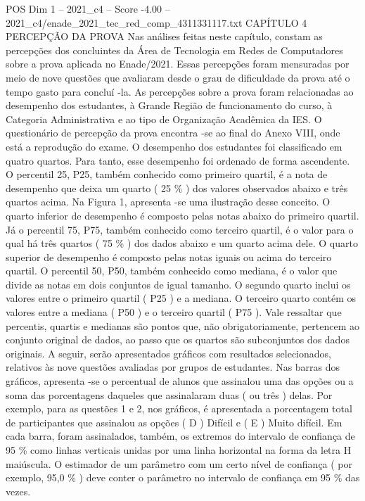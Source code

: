 \begin{textsample}{POS Dim 1 – 2021\_c4 – Score -4.00 – 2021\_c4/enade\_2021\_tec\_red\_comp\_4311331117.txt}  \label{ex:f1_pos_371}
CAPÍTULO 4 PERCEPÇÃO DA PROVA Nas análises feitas neste capítulo, constam as percepções dos concluintes da Área de Tecnologia em Redes de Computadores sobre a prova aplicada no Enade/2021.
Essas percepções foram mensuradas por meio de nove questões que avaliaram desde o grau de dificuldade da prova até o tempo gasto para concluí -la.
As percepções sobre a prova foram relacionadas ao desempenho dos estudantes, à Grande Região de funcionamento do curso, à Categoria Administrativa e ao tipo de Organização Acadêmica da IES.
O questionário de percepção da prova encontra -se ao final do Anexo VIII, onde está a reprodução do exame.
O desempenho dos estudantes foi classificado em quatro quartos.
Para tanto, esse desempenho foi ordenado de forma ascendente.
O percentil 25, P25, também conhecido como primeiro quartil, é a nota de desempenho que deixa um quarto ( 25 \% ) dos valores observados abaixo e três quartos acima.
Na Figura 1, apresenta -se uma ilustração desse conceito.
O quarto inferior de desempenho é composto pelas notas abaixo do primeiro quartil.
Já o percentil 75, P75, também conhecido como terceiro quartil, é o valor para o qual há três quartos ( 75 \% ) dos dados abaixo e um quarto acima dele.
O quarto superior de desempenho é composto pelas notas iguais ou acima do terceiro quartil.
O percentil 50, P50, também conhecido como mediana, é o valor que divide as notas em dois conjuntos de igual tamanho.
O segundo quarto inclui os valores entre o primeiro quartil ( P25 ) e a mediana.
O terceiro quarto contém os valores entre a mediana ( P50 ) e o terceiro quartil ( P75 ).
Vale ressaltar que percentis, quartis e medianas são pontos que, não obrigatoriamente, pertencem ao conjunto original de dados, ao passo que os quartos são subconjuntos dos dados originais.
A seguir, serão apresentados gráficos com resultados selecionados, relativos às nove questões avaliadas por grupos de estudantes.
Nas barras dos gráficos, apresenta -se o percentual de alunos que assinalou uma das opções ou a soma das porcentagens daqueles que assinalaram duas ( ou três ) delas.
Por exemplo, para as questões 1 e 2, nos gráficos, é apresentada a porcentagem total de participantes que assinalou as opções ( D ) Difícil e ( E ) Muito difícil.
Em cada barra, foram assinalados, também, os extremos do intervalo de confiança de 95 \% como linhas verticais unidas por uma linha horizontal na forma da letra H maiúscula.
O estimador de um parâmetro com um certo nível de confiança ( por exemplo, 95,0 \% ) deve conter o parâmetro no intervalo de confiança em 95 \% das vezes.

\end{textsample}
